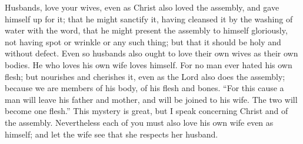{\par }{\PP {}Husbands, love your wives, even as Christ also loved the assembly, and gave himself up for it;
that he might sanctify it, having cleansed it by the washing of water with the word,
that he might present the assembly to himself gloriously, not having spot or wrinkle or any such thing; but that it should be holy and without defect.
Even so husbands also ought to love their own wives as their own bodies. He who loves his own wife loves himself.
For no man ever hated his own flesh; but nourishes and cherishes it, even as the Lord also does the assembly;
because we are members of his body, of his flesh and bones.
“For this cause a man will leave his father and mother, and will be joined to his wife. The two will become one flesh.”
This mystery is great, but I speak concerning Christ and of the assembly.
Nevertheless each of you must also love his own wife even as himself; and let the wife see that she respects her husband.

}
